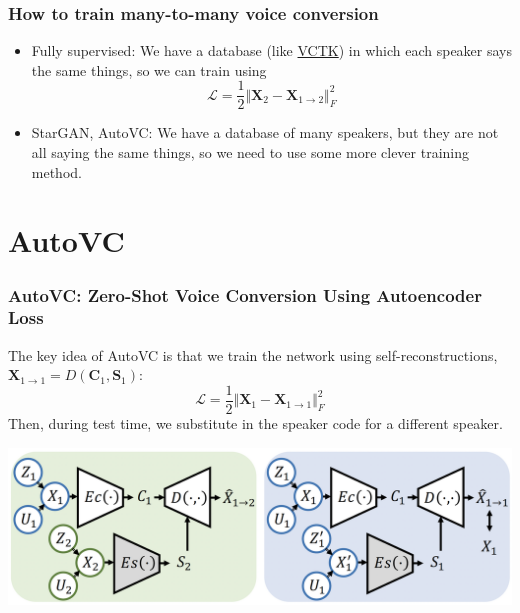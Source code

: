 \documentclass{beamer}
\begin{document}
\begin{frame}
  \frametitle{How to train many-to-many voice conversion}

  \begin{itemize}
  \item Fully supervised: We have a database (like
    \href{https://datashare.ed.ac.uk/handle/10283/2651}{VCTK}) in
    which each speaker says the same things, so we can train using
    \begin{displaymath}
      \mathcal{L}=\frac{1}{2}\Vert\bm{X}_2-\bm{X}_{1\rightarrow 2}\Vert_F^2
    \end{displaymath}
  \item StarGAN, AutoVC: We have a database of many speakers, but they
    are not all saying the same things, so we need to use some more
    clever training method.
  \end{itemize}
\end{frame}
    

\section{AutoVC}
\setcounter{subsection}{1}

\begin{frame}
  \frametitle{AutoVC: Zero-Shot Voice Conversion Using Autoencoder Loss}

  The key idea of AutoVC is that we train the network using
  self-reconstructions, $\bm{X}_{1\rightarrow
    1}=D(\bm{C}_1,\bm{S}_1)$:
  \begin{displaymath}
    \mathcal{L}=\frac{1}{2}\Vert\bm{X}_1-\bm{X}_{1\rightarrow 1}\Vert_F^2
  \end{displaymath}
  Then, during test time, we substitute in the speaker code for a
  different speaker.
  \centerline{\includegraphics[width=\textwidth]{figs/qianfig1.png}}
    
\end{frame}
\end{document}
